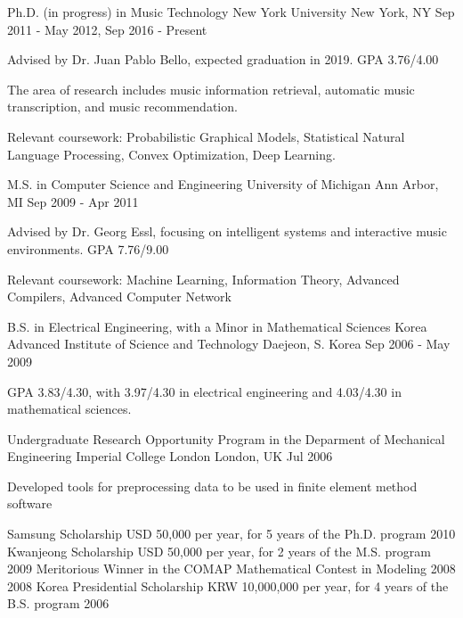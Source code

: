 \documentclass[12pt, a4paper]{awesome-cv}
\begin{document}
	
	\begin{cventries}
		\cventry
		{Ph.D. (in progress) in Music Technology}
		{New York University}
		{New York, NY}
		{Sep 2011 - May 2012, Sep 2016 - Present}
		{
			\begin{cvitemscondensed}
				\item Advised by Dr. Juan Pablo Bello, expected graduation in 2019. GPA 3.76/4.00
				\item The area of research includes music information retrieval, automatic music transcription, and music recommendation.
				\item Relevant coursework: Probabilistic Graphical Models, Statistical Natural Language Processing, Convex Optimization, Deep Learning.
			\end{cvitemscondensed}
		}
		\cventry
		{M.S. in Computer Science and Engineering}
		{University of Michigan}
		{Ann Arbor, MI}
		{Sep 2009 - Apr 2011}
		{
			\begin{cvitemscondensed}
				\item Advised by Dr. Georg Essl, focusing on intelligent systems and interactive music environments. GPA 7.76/9.00
				\item Relevant coursework: Machine Learning, Information Theory, Advanced Compilers, Advanced Computer Network
			\end{cvitemscondensed}
		}
		\cventry
		{B.S. in Electrical Engineering, with a Minor in Mathematical Sciences}
		{Korea Advanced Institute of Science and Technology}
		{Daejeon, S. Korea}
		{Sep 2006 - May 2009}
		{
			\begin{cvitemscondensed}
				\item {GPA 3.83/4.30, with 3.97/4.30 in electrical engineering and 4.03/4.30 in mathematical sciences.}
			\end{cvitemscondensed}
		}
		\cventry
		{Undergraduate Research Opportunity Program in the Deparment of Mechanical Engineering}
		{Imperial College London}
		{London, UK}
		{Jul 2006}
		{
			\begin{cvitemscondensed}
				\item {Developed tools for preprocessing data to be used in finite element method software}
			\end{cvitemscondensed}
		}
	\end{cventries}

	\begin{cvhonors}
		\cvhonor
		{Samsung Scholarship}
		{USD 50,000 per year, for 5 years of the Ph.D. program}
		{}{2010}
		\cvhonor
		{Kwanjeong Scholarship}
		{USD 50,000 per year, for 2 years of the M.S. program}
		{}{2009}
		\cvhonor
		{Meritorious Winner}
		{in the COMAP Mathematical Contest in Modeling 2008}
		{}{2008}
		\cvhonor
		{Korea Presidential Scholarship}
		{KRW 10,000,000 per year, for 4 years of the B.S. program}
		{}{2006}
	\end{cvhonors}
\end{document}
